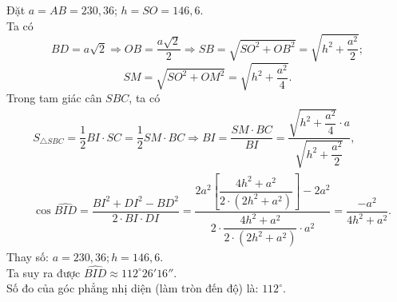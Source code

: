 \begin{ex}
{Đặt $a = AB = 230{,}36$; $h = SO = 146{,}6$.  \\
Ta có
\[BD = a\sqrt{2} \Rightarrow OB=\dfrac{a\sqrt{2}}{2} \Rightarrow SB =\sqrt{SO^2 + OB^2} = \sqrt{h^2 + \dfrac{a^2}{2}};\]
\[SM = \sqrt{SO^2 + OM^2} = \sqrt{h^2 + \dfrac{a^2}{4}}.\]
Trong tam giác cân $SBC$, ta có
\begin{eqnarray*}
& S_{\triangle SBC} = \dfrac{1}{2} BI \cdot SC = \dfrac{1}{2} SM \cdot BC \Rightarrow BI = \dfrac{SM \cdot BC}{BI} = \dfrac{\sqrt{h^2 + \dfrac{a^2}{4}} \cdot a}{\sqrt{h^2 + \dfrac{a^2}{2}}}, \\
& \cos \widehat{BID} = \dfrac{BI^2 + DI^2 - BD^2}{2 \cdot BI \cdot DI} = \dfrac{2a^2 \left[\dfrac{4h^2 + a^2}{2 \cdot (2h^2 + a^2)}\right]- 2a^2}{2 \cdot \dfrac{4h^2 + a^2}{2 \cdot (2h^2 + a^2)} \cdot a^2} = \dfrac{-a^2}{4h^2 + a^2}.
\end{eqnarray*}
Thay số: $a = 230{,}36; h = 146{,}6.$\\
Ta suy ra được $\widehat{BID} \approx 112^\circ 26' 16''$.  \\
Số đo của góc phẳng nhị diện (làm tròn đến độ) là: $112^\circ$.
}
\end{ex}

